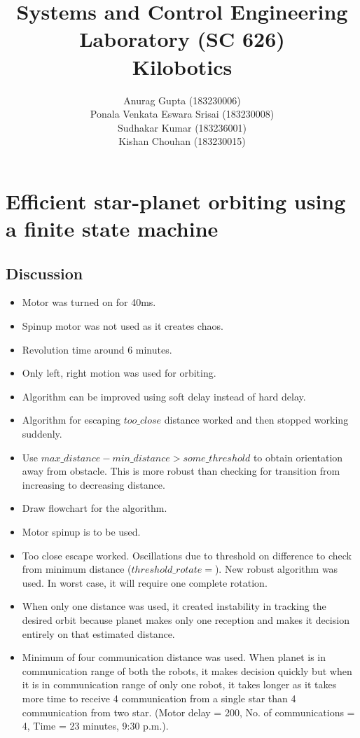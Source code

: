\documentclass{report}[12pt]
\author{Anurag Gupta (183230006) \\ Ponala Venkata Eswara Srisai
(183230008)\\ Sudhakar Kumar (183236001)\\ Kishan Chouhan (183230015)}
\title{Systems and Control Engineering Laboratory (SC 626) \\ Kilobotics}
\begin{document}
\maketitle
\tableofcontents
\thispagestyle{empty}
\mbox{}
%

\chapter{Efficient star-planet orbiting using a finite state machine}
\section{Discussion}
\begin{itemize}
    \item Motor was turned on for 40ms.
    \item Spinup motor was not used as it creates chaos.
    \item Revolution time around 6 minutes.
    \item Only left, right motion was used for orbiting.
    \item Algorithm can be improved using soft delay instead of hard delay.
    \item Algorithm for escaping $too\_close$ distance worked and then stopped working suddenly.
    \item Use $max\_distance-min\_distance>some\_threshold$ to obtain orientation away from obstacle. This is more robust than checking for transition from increasing to decreasing distance.
    \item Draw flowchart for the algorithm.
    \item Motor spinup is to be used.
    \item Too close escape worked. Oscillations due to threshold on difference to check from minimum distance ($threshold\_rotate = $). New robust algorithm was used. In worst case, it will require one complete rotation.
    \item When only one distance was used, it created instability in tracking the desired orbit because planet makes only one reception and makes it decision entirely on that estimated distance.
    \item Minimum of four communication distance was used. When planet is in communication range of both the robots, it makes decision quickly but when it is in communication range of only one robot, it takes longer as it takes more time to receive 4 communication from a single star than 4 communication from two star. (Motor delay = 200, No. of communications = 4, Time = 23 minutes, 9:30 p.m.).

\end{itemize}
\end{document}
